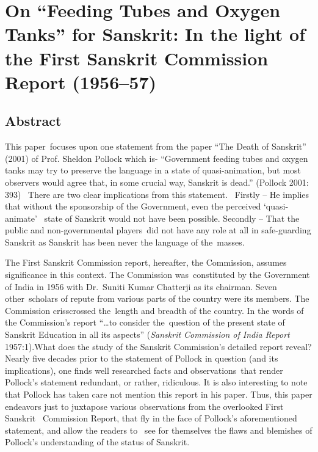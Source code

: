 \chapter[On “Feeding Tubes and Oxygen Tanks” for Sanskrit....]{On “Feeding Tubes and Oxygen Tanks” for Sanskrit: 
In the light of the First Sanskrit Commission Report (1956--57)}\label{chapter6}


\section*{Abstract}
 
This paper focuses upon one statement from the paper “The Death of Sanskrit” (2001) of Prof. Sheldon Pollock which is- “Government feeding tubes and oxygen tanks may try to preserve the language in a state of quasi-animation, but most observers would agree that, in some crucial way, Sanskrit is dead.” (Pollock 2001: 393)  There are two clear implications from this statement.  Firstly – He implies that without the sponsorship of the Government, even the perceived ‘quasi-animate’  state of Sanskrit would not have been possible. Secondly – That the public and non-governmental players did not have any role at all in safe-guarding Sanskrit as Sanskrit has been never the language of the masses.  

The First Sanskrit Commission report, hereafter, the Commission, assumes significance in this context. The Commission was constituted by the Government of India in 1956 with Dr.\ Suniti Kumar Chatterji as its chairman. Seven other scholars of repute from various parts of the country were its members. The Commission crisscrossed the length and breadth of the country. In the words of the Commission’s report “…to consider the question of the present state of Sanskrit Education in all its aspects” ({\sl Sanskrit Commission of India Report} 1957:1).What does the study of the Sanskrit Commission’s detailed report reveal? Nearly five decades prior to the statement of Pollock in question (and its implications), one finds well researched facts and observations that render Pollock’s statement redundant, or rather, ridiculous. It is also interesting to note that Pollock has taken care not mention this report in his paper. Thus, this paper endeavors just to juxtapose various observations from the overlooked First Sanskrit  Commission Report, that fly in the face of Pollock’s aforementioned statement, and allow the readers to  see for themselves the flaws and blemishes of Pollock’s understanding of the status of Sanskrit.

